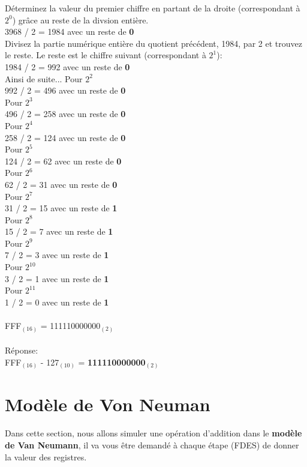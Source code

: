 \begin{Exercice}[20 minutes]
    Déterminez la valeur du premier chiffre en partant de la droite (correspondant à $2^0$) grâce au reste de la divsion entière.\\
    3968 / 2 = 1984 avec un reste de \textbf{0}\\
    Divisez la partie numérique entière du quotient précédent, 1984, par 2 et trouvez le reste. Le reste est le chiffre suivant (correspondant à $2^1$):\\
    1984 / 2 = 992 avec un reste de \textbf{0}\\
    Ainsi de suite... Pour $2^2$\\
    992 / 2 = 496 avec un reste de \textbf{0}\\
    Pour $2^3$\\
    496 / 2 = 258 avec un reste de \textbf{0}\\
    Pour $2^4$\\
    258 / 2 = 124 avec un reste de \textbf{0}\\
    Pour $2^5$\\
    124 / 2 = 62 avec un reste de \textbf{0}\\
    Pour $2^6$\\
    62 / 2 = 31 avec un reste de \textbf{0}\\
    Pour $2^7$\\
    31 / 2 = 15 avec un reste de \textbf{1}\\
    Pour $2^8$\\
    15 / 2 = 7 avec un reste de \textbf{1}\\
    Pour $2^9$\\
    7 / 2 = 3 avec un reste de \textbf{1}\\
    Pour $2^10$\\
    3 / 2 = 1 avec un reste de \textbf{1}\\
    Pour $2^11$\\
    1 / 2 = 0 avec un reste de \textbf{1}\\\\

    FFF$_{(16)}$ = 111110000000$_{(2)}$\\\\

    Réponse:\\
    FFF$_{(16)}$ - 127$_{(10)}$ = \textbf{111110000000$_{(2)}$}

\end{Exercice}


\newpage
\section{Modèle de Von Neuman}
Dans cette section, nous allons simuler une opération d'addition dans le \textbf{modèle de Van Neumann}, il va vous être demandé à chaque étape (FDES) de donner la valeur des registres.\\

